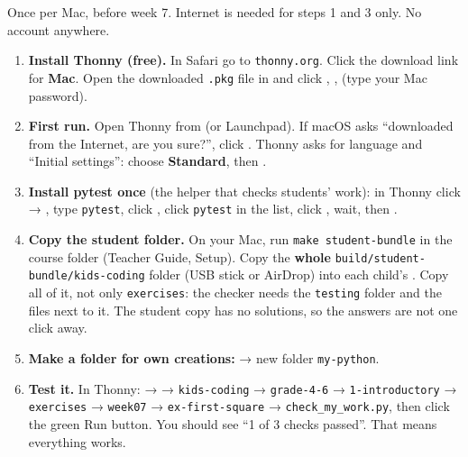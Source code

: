 \begin{teachernote}
Once per Mac, before week 7. Internet is needed for steps 1 and 3 only. No account anywhere.
\begin{enumerate}[leftmargin=1.4em,itemsep=1pt]
  \item \textbf{Install Thonny (free).} In Safari go to \texttt{thonny.org}. Click the download link for \textbf{Mac}. Open the downloaded \texttt{.pkg} file in  and click , ,  (type your Mac password).
  \item \textbf{First run.} Open Thonny from  (or Launchpad). If macOS asks \enquote{downloaded from the Internet, are you sure?}, click . Thonny asks for language and \enquote{Initial settings}: choose \textbf{Standard}, then .
  \item \textbf{Install pytest once} (the helper that checks students' work): in Thonny click  → , type \texttt{pytest}, click , click \texttt{pytest} in the list, click , wait, then .
  \item \textbf{Copy the student folder.} On your Mac, run \texttt{make student-bundle} in the course folder (Teacher Guide, Setup). Copy the \textbf{whole} \texttt{build/student-bundle/kids-coding} folder (USB stick or AirDrop) into each child's . Copy all of it, not only \texttt{exercises}: the checker needs the \texttt{testing} folder and the files next to it. The student copy has no solutions, so the answers are not one click away.
  \item \textbf{Make a folder for own creations:}  → new folder \texttt{my-python}.
  \item \textbf{Test it.} In Thonny:  →  → \texttt{kids-coding} → \texttt{grade-4-6} → \texttt{1-introductory} → \texttt{exercises} → \texttt{week07} → \texttt{ex-first-square} → \texttt{check\_my\_work.py}, then click the green Run button. You should see \enquote{1 of 3 checks passed}. That means everything works.
\end{enumerate}
\end{teachernote}

